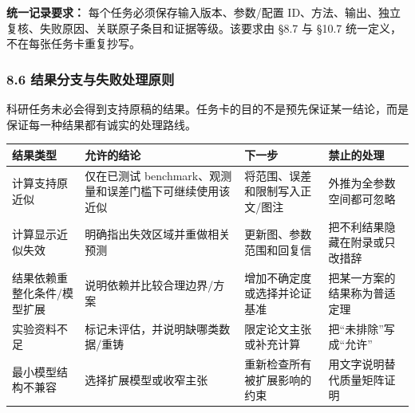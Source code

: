 \documentclass[
  chinese,
  UTF8]{ctexart}
\newcounter{none} %
\begin{document}
\textbf{统一记录要求：} 每个任务必须保存输入版本、参数/配置
ID、方法、输出、独立复核、失败原因、关联原子条目和证据等级。该要求由
§8.7 与 §10.7 统一定义，不在每张任务卡重复抄写。

\subsubsection{8.6
结果分支与失败处理原则}\label{ux7ed3ux679cux5206ux652fux4e0eux5931ux8d25ux5904ux7406ux539fux5219}

科研任务未必会得到支持原稿的结果。任务卡的目的不是预先保证某一结论，而是保证每一种结果都有诚实的处理路线。

{\def\LTcaptype{none} %
\begin{longtable}[]{@{}
  >{\raggedright\arraybackslash}p{}
  >{\raggedright\arraybackslash}p{}
  >{\raggedright\arraybackslash}p{}
  >{\raggedright\arraybackslash}p{}@{}}
\toprule\noalign{}
\begin{minipage}[b]{\linewidth}\raggedright
结果类型
\end{minipage} & \begin{minipage}[b]{\linewidth}\raggedright
允许的结论
\end{minipage} & \begin{minipage}[b]{\linewidth}\raggedright
下一步
\end{minipage} & \begin{minipage}[b]{\linewidth}\raggedright
禁止的处理
\end{minipage} \\
\midrule\noalign{}
\endhead
\bottomrule\noalign{}
\endlastfoot
计算支持原近似 & 仅在已测试
benchmark、观测量和误差门槛下可继续使用该近似 &
将范围、误差和限制写入正文/图注 & 外推为全参数空间都可忽略 \\
计算显示近似失效 & 明确指出失效区域并重做相关预测 &
更新图、参数范围和回复信 & 把不利结果隐藏在附录或只改措辞 \\
结果依赖重整化条件/模型扩展 & 说明依赖并比较合理边界/方案 &
增加不确定度或选择并论证基准 & 把某一方案的结果称为普适定理 \\
实验资料不足 & 标记未评估，并说明缺哪类数据/重铸 &
限定论文主张或补充计算 & 把``未排除''写成``允许'' \\
最小模型结构不兼容 & 选择扩展模型或收窄主张 &
重新检查所有被扩展影响的约束 & 用文字说明替代质量矩阵证明 \\
\end{longtable}
}
\end{document}
